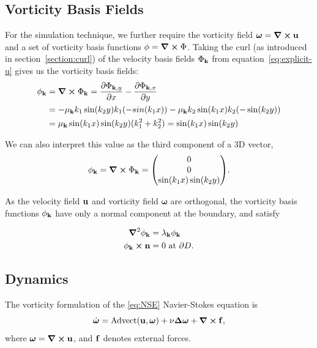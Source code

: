 \subsection*{Vorticity Basis Fields}
For the simulation technique, we further require the vorticity field
$\boldsymbol\omega = \curl{\vb{u}}$ and a set of vorticity basis functions $\phi
= \curl{\Phi}$.  Taking the curl (as introduced in section~\ref{section:curl})
of the velocity basis fields $\Phi_{\vb{k}}$ from equation~\eqref{eq:explicit-u}
gives us the vorticity basis fields:
\begin{align*}
    \phi_{\vb{k}} &= \curl{\Phi_{\vb{k}}} 
    =  \pdv{\Phi_{\vb{k},y}}{x} - \pdv{\Phi_{\vb{k},x}}{y}\\
&= -\mu_{\vb{k}} k_1 \sin(k_2 y) k_1(-sin(k_1 x)) - \mu_{\vb{k}} k_2 \sin(k_1 x)
    k_2 (-\sin(k_2 y))\\
&= \mu_{\vb{k}} \sin(k_1 x) \sin(k_2 y)(k_1^2+k_2^2) = \sin(k_1 x) \sin(k_2 y)
\end{align*}

We can also interpret this value as the third component of a 3D vector,
\begin{equation}
\label{eq:vorticity-basis}
\phi_{\vb{k}} = \curl{\Phi_{\vb{k}}} 
= \mqty(0 \\ 0 \\ \sin(k_1 x) \sin(k_2 y)).
\end{equation}

As the velocity field $\vb{u}$ and vorticity field $\boldsymbol{\omega}$ are
orthogonal, the vorticity basis functions $\phi_{\vb{k}}$ have only a normal
component at the boundary, and satisfy

\begin{align}
    \grad^2{\phi_{\vb{k}}} &= \lambda_{\vb{k}}\phi_{\vb{k}}\\
    \phi_{\vb{k}} \cross \vb{n} &= 0 \text{ at } \partial D.
\end{align}

\subsection*{Dynamics}
The vorticity formulation of the \eqref{eq:NSE} Navier-Stokes equation is
\begin{equation}
    \dot{\boldsymbol{\omega}} = \text{Advect}(\bf{u}, \boldsymbol{\omega}) + \nu
    \Delta\boldsymbol{\omega}
    + \curl{\bf{f}},
\label{eq:NSE-vorticity}
\end{equation}
where $\boldsymbol{\omega} = \curl{\bf{u}}$, and $\bf{f}$ denotes external
forces.

